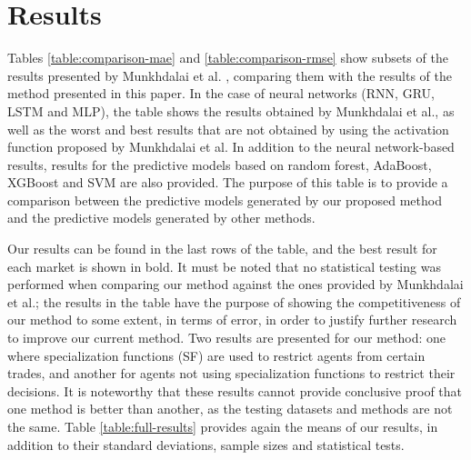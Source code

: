 \documentclass{ieeeaccess}
\begin{document}
\section{Results}
\label{section:results}

Tables \ref{table:comparison-mae} and \ref{table:comparison-rmse} show
subsets of the results presented by Munkhdalai et
al. \cite{Munkhdalai2019}, comparing them with the results of the
method presented in this paper. In the case of neural networks (RNN, GRU,
LSTM and MLP), the table shows the results obtained by Munkhdalai et
al., as well as the worst and best results that are not obtained
by
using the activation function proposed by Munkhdalai et al. In
addition to the neural network-based results, results for the
predictive models based on random forest, AdaBoost, XGBoost and
SVM are also provided. The purpose of this table
is to provide a comparison between the predictive models generated by
our proposed method and the predictive models generated by other
methods.

Our results can be found in the last rows of the table, and the best
result for each market is shown in bold. It must be noted that no
statistical testing was performed when comparing our method against
the ones provided by Munkhdalai et al.; the results in the table
have the purpose of showing the competitiveness of our method to some
extent, in terms of error, in order to justify further research to
improve our current method. Two results are presented for
our method: one where specialization functions (SF) are used to restrict agents
from certain trades, and another for agents not using specialization
functions to restrict their decisions. It is noteworthy that these
results cannot provide conclusive proof that one method is better than
another, as the testing datasets and methods are not the same. Table
\ref{table:full-results} provides again the means of our results, in
addition to their standard deviations, sample sizes and statistical
tests.

\end{document}
